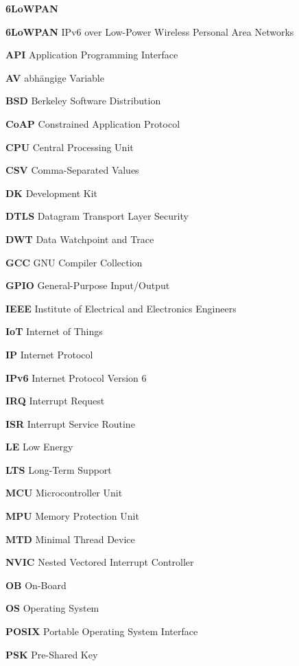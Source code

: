 \begin{abbreviations}{\textbf{6LoWPAN}}
  \item[\textbf{6LoWPAN}] IPv6 over Low-Power Wireless Personal Area Networks
  \item[\textbf{API}] Application Programming Interface
  \item[\textbf{AV}] abh\"angige Variable
  \item[\textbf{BSD}] Berkeley Software Distribution
  \item[\textbf{CoAP}] Constrained Application Protocol
  \item[\textbf{CPU}] Central Processing Unit
  \item[\textbf{CSV}] Comma-Separated Values
  \item[\textbf{DK}] Development Kit
  \item[\textbf{DTLS}] Datagram Transport Layer Security
  \item[\textbf{DWT}] Data Watchpoint and Trace
  \item[\textbf{GCC}] GNU Compiler Collection
  \item[\textbf{GPIO}] General-Purpose Input/Output
  \item[\textbf{IEEE}] Institute of Electrical and Electronics Engineers
  \item[\textbf{IoT}] Internet of Things
  \item[\textbf{IP}] Internet Protocol
  \item[\textbf{IPv6}] Internet Protocol Version 6
  \item[\textbf{IRQ}] Interrupt Request
  \item[\textbf{ISR}] Interrupt Service Routine
  \item[\textbf{LE}] Low Energy
  \item[\textbf{LTS}] Long-Term Support
  \item[\textbf{MCU}] Microcontroller Unit
  \item[\textbf{MPU}] Memory Protection Unit
  \item[\textbf{MTD}] Minimal Thread Device
  \item[\textbf{NVIC}] Nested Vectored Interrupt Controller
  \item[\textbf{OB}] On-Board
  \item[\textbf{OS}] Operating System
  \item[\textbf{POSIX}] Portable Operating System Interface
  \item[\textbf{PSK}] Pre-Shared Key

\end{abbreviations}
